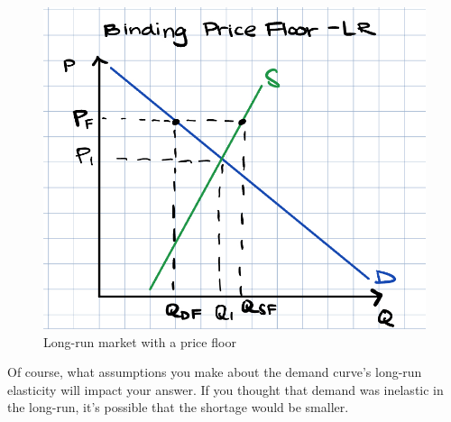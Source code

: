 \documentclass[12pt]{article}
\begin{document}
\begin{enumerate}
\begin{figure}
    \centering
    \includegraphics[width=.6\textwidth]{Orioles_floor_long.png}
    \caption{Long-run market with a price floor}
    \label{fig:Orioles_floor_long}
\end{figure}

\vspace{2mm}

Of course, what assumptions you make about the demand curve's long-run elasticity will impact your answer. If you thought that demand was inelastic in the long-run, it's possible that the shortage would be smaller.


    \end{enumerate}
\end{document}
